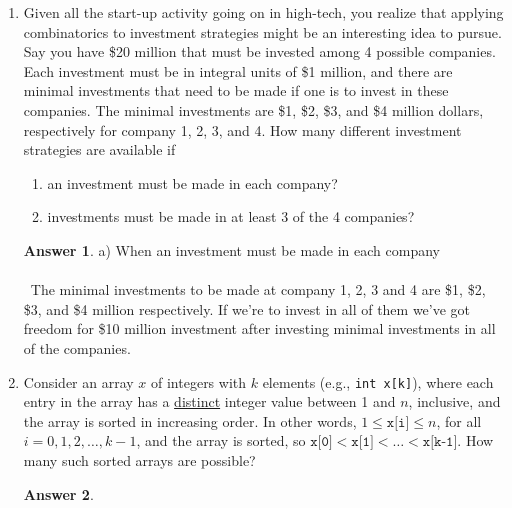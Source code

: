 \documentclass[12pt]{article}
\renewcommand{\(}{\left(}
\renewcommand{\)}{\right)}
\theoremstyle{definition}
\newtheorem*{answer}{Answer}
\begin{document}
\begin{enumerate}
\item Given all the start-up activity going on in high-tech, you realize that applying combinatorics to investment strategies might be an interesting idea to pursue.  
      Say you have \$20 million that must be invested among 4 possible companies.
      Each investment must be in integral units of \$1 million, and there are minimal investments that need to be made if one is to invest in these companies.  
      The minimal investments are \$1, \$2, \$3, and \$4 million dollars, respectively for company 1, 2, 3, and 4.  How many different investment strategies are available if
    \begin{enumerate}[label=\alph*.]

    \item an investment must be made in each company?
    \item investments must be made in at least 3 of the 4 companies?

    \end{enumerate}

    \begin{shaded}
    \begin{answer}
        a) When an investment must be made in each company \\\\
        \ The minimal investments to be made at company 1, 2, 3 and 4 are \$1, \$2, \$3, and \$4 million respectively. If we're to invest in all
        of them we've got freedom for \$10 million investment after investing minimal investments in all of the companies. 
    \end{answer}
    \end{shaded}
    \newpage


\item Consider an array $x$ of integers with $k$ elements (e.g., \texttt{int x[k]}), where each entry in the array has a \underline{distinct} integer value between 1 and $n$, inclusive, and the array is sorted in increasing order. In other words, $1 \leq \texttt{x[i]} \leq n$, for all $i = 0, 1, 2, \dotsc, k - 1$, and the array is sorted, so $\texttt{x[0]} < \texttt{x[1]} < \dotsc < \texttt{x[k-1]}$.  How many such sorted arrays are possible?

    \begin{shaded}
    \begin{answer}

    \end{answer}
    \end{shaded}
    \newpage



\end{enumerate}
\end{document}
